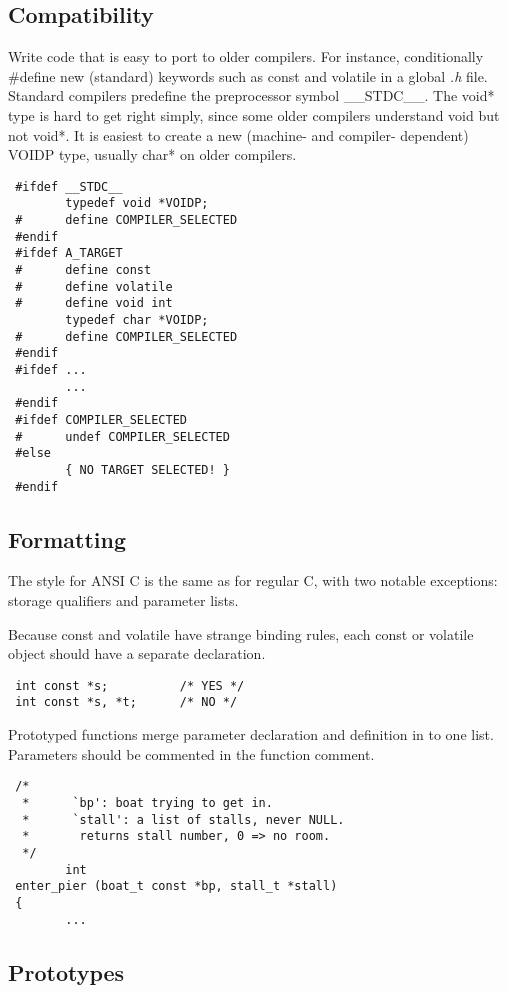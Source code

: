 \subsection{Compatibility}

 Write code that is easy to port to older compilers. For instance,
conditionally \#define new (standard) keywords such as const and volatile in a
global {\em .h} file. Standard compilers predefine the preprocessor symbol
\_\_STDC\_\_. The void* type is hard to get right simply, since some older
compilers understand void but not void*. It is easiest to create a new
(machine- and compiler- dependent) VOIDP type, usually char* on older
compilers.
\begin{verbatim}
 #ifdef __STDC__
        typedef void *VOIDP;
 #      define COMPILER_SELECTED
 #endif
 #ifdef A_TARGET
 #      define const
 #      define volatile
 #      define void int
        typedef char *VOIDP;
 #      define COMPILER_SELECTED
 #endif
 #ifdef ...
        ...
 #endif
 #ifdef COMPILER_SELECTED
 #      undef COMPILER_SELECTED
 #else
        { NO TARGET SELECTED! }
 #endif 
\end{verbatim}

\subsection{Formatting }

 The style for ANSI C is the same as for regular C, with two notable
exceptions: storage qualifiers and parameter lists. 

 Because const and volatile have strange binding rules, each const or volatile
object should have a separate declaration. 
\begin{verbatim}
 int const *s;          /* YES */
 int const *s, *t;      /* NO */ 
\end{verbatim}

 Prototyped functions merge parameter declaration and definition in to one
list. Parameters should be commented in the function comment. 
\begin{verbatim}
 /*
  *      `bp': boat trying to get in.
  *      `stall': a list of stalls, never NULL.
  *       returns stall number, 0 => no room.
  */
        int
 enter_pier (boat_t const *bp, stall_t *stall)
 {
        ... 
\end{verbatim}
\subsection{Prototypes}

